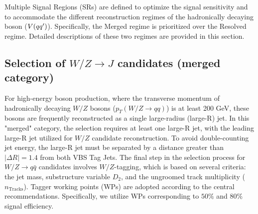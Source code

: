 \label{subsec:sr_selection}

Multiple Signal Regions (SRs) are defined to optimize the signal sensitivity and to accommodate the different reconstruction regimes of the hadronically decaying boson ($V(q q^{\prime})$). Specifically, the Merged regime is prioritized over the Resolved regime. Detailed descriptions of these two regimes are provided in this section.


\subsection{Selection of \texorpdfstring{$W/Z \to J$}{W/Z -> J} candidates (merged category)}
\label{subsubsec:merged_jets_selection}

For high-energy boson production, where the transverse momentum of hadronically decaying $W/Z$ bosons ($p_{T}(W/Z \rightarrow qq)$) is at least 200 GeV, these bosons are frequently reconstructed as a single large-radius (large-R) jet. In this "merged" category, the selection requires at least one large-R jet, with the leading large-R jet utilized for $W/Z$ candidate reconstruction. To avoid double-counting jet energy, the large-R jet must be separated by a distance greater than $|\Delta R| = 1.4$ from both VBS Tag Jets.
%
The final step in the selection process for $W/Z \to q\bar{q}$ candidates involves $W/Z$-tagging, which is based on several criteria: the jet mass, substructure variable $D_2$, and the ungroomed track multiplicity ($n_{\text{Tracks}}$). Tagger working points (WPs) are adopted according to the central recommendations. Specifically, we utilize WPs corresponding to $50\%$ and $80\%$ signal efficiency.

